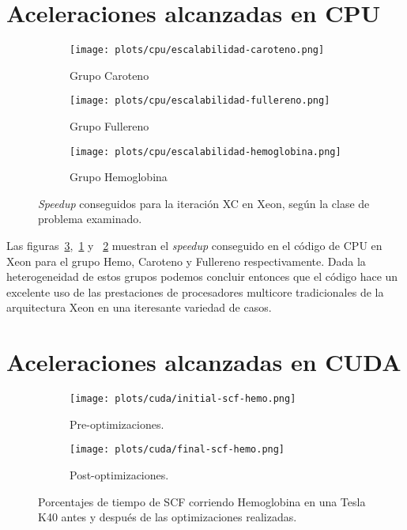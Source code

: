 \section{Aceleraciones alcanzadas en CPU}

\begin{figure}[htbp]
\centering
\begin{subfigure}[b]{\plotwidthtres}
   \texttt{[image: plots/cpu/escalabilidad-caroteno.png]}
   \caption{Grupo Caroteno}
   \label{fig:cpu-scalability-caroteno}
 \end{subfigure}
\begin{subfigure}[b]{\plotwidthtres}
   \texttt{[image: plots/cpu/escalabilidad-fullereno.png]}
   \caption{Grupo Fullereno}
   \label{fig:cpu-scalability-fullereno}
 \end{subfigure}
\begin{subfigure}[b]{\plotwidthtres}
   \texttt{[image: plots/cpu/escalabilidad-hemoglobina.png]}
   \caption{Grupo Hemoglobina}
   \label{fig:cpu-scalability-hemo}
 \end{subfigure}
 \caption{\textit{Speedup} conseguidos para la iteraci\'on XC en Xeon, seg\'un
 la clase de problema examinado.}
 \label{fig:cpu-scalability}
\end{figure}

Las figuras~\ref{fig:cpu-scalability-hemo},~\ref{fig:cpu-scalability-caroteno} y
~\ref{fig:cpu-scalability-fullereno} muestran el \textit{speedup} conseguido en
el c\'odigo de CPU en Xeon para el grupo Hemo, Caroteno y Fullereno respectivamente.
Dada la heterogeneidad de estos grupos podemos concluir entonces que el c\'odigo
hace un excelente uso de las prestaciones de procesadores multicore tradicionales
de la arquitectura Xeon en una iteresante variedad de casos.

\section{Aceleraciones alcanzadas en CUDA}
\label{resultados-cuda}

\begin{figure}[htbp]
\centering
\begin{subfigure}[b]{\plotwidthtres}
   \texttt{[image: plots/cuda/initial-scf-hemo.png]}
   \caption{Pre-optimizaciones.}
   \label{fig:initial-cuda-scf}
 \end{subfigure}
 \begin{subfigure}[b]{\plotwidthtres}
   \texttt{[image: plots/cuda/final-scf-hemo.png]}
   \caption{Post-optimizaciones.}
   \label{fig:final-cuda-scf}
 \end{subfigure}
 \caption{Porcentajes de tiempo de SCF corriendo Hemoglobina en una Tesla K40 antes y despu\'es de
 las optimizaciones realizadas.}
 \label{fig:cuda-scf}
\end{figure}

